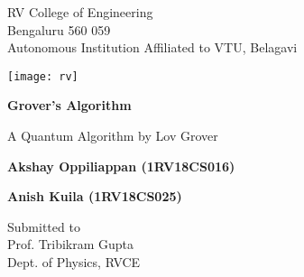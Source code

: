\documentclass[a4paper]{article}
\begin{document}
\begin{titlepage}
   \begin{center}
       \vspace*{1cm}

       RV College of Engineering\\
       Bengaluru 560 059\\
       Autonomous Institution Affiliated to VTU, Belagavi

       \vspace{2.5cm}

       \texttt{[image: rv]}
       \vspace{0.5cm}

       \textbf{Grover's Algorithm}

       \vspace{0.5cm}
       A Quantum Algorithm by Lov Grover

       \vfill


       \textbf{Akshay Oppiliappan (1RV18CS016)}

       \textbf{Anish Kuila (1RV18CS025)}

       \vspace{1.5cm}

       Submitted to\\
       Prof. Tribikram Gupta \\
       Dept. of Physics, RVCE

       \vspace{0.8cm}



   \end{center}
\end{titlepage}
\pagebreak
\end{document}
